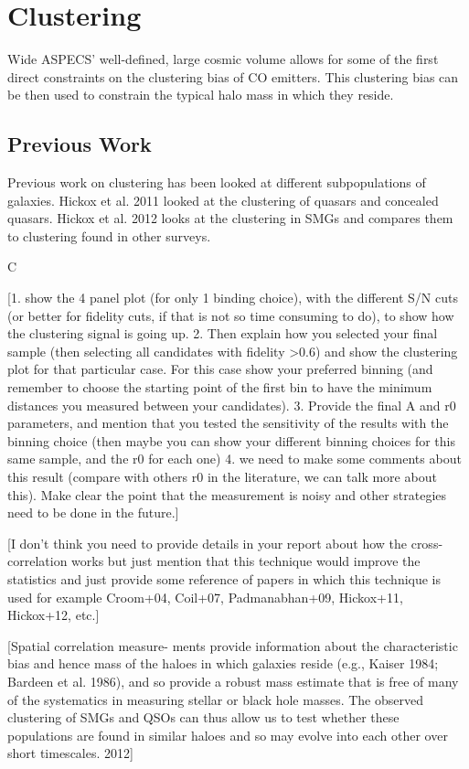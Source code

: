 \chapter{Clustering}

Wide ASPECS' well-defined, large cosmic volume allows for some of the first direct constraints on the clustering bias of CO emitters. This clustering bias can be then used to constrain the typical halo mass in which they reside. 

\section{Previous Work}

Previous work on clustering has been looked at different subpopulations of galaxies. Hickox et al. 2011 looked at the clustering of quasars and concealed quasars. Hickox et al. 2012 looks at the clustering in SMGs and compares them to clustering found in other surveys. 


C

[1. show the 4 panel plot (for only 1 binding choice), with the different S/N cuts (or better for fidelity cuts, if that is not so time consuming to do), to show how the clustering signal is going up. 
2. Then explain how you selected your final sample (then selecting all candidates with fidelity >0.6) and show the clustering plot for that particular case. For this case show your preferred binning (and remember to choose the starting point of the first bin to have the minimum distances you measured between your candidates). 
3. Provide the final A and r0 parameters, and mention that you tested the sensitivity of the results with the binning choice (then maybe you can show your different binning choices for this same sample, and the r0 for each one)
4. we need to make some comments about this result (compare with others r0 in the literature, we can talk more about this). Make clear the point that the measurement is noisy and other strategies need to be done in the future.]

[I don’t think you need to provide details in your report about how the cross-correlation works but just mention that this technique would improve the statistics and just provide some reference of papers in which this technique is used for example Croom+04, Coil+07, Padmanabhan+09, Hickox+11, Hickox+12, etc.]

[Spatial correlation measure-
ments provide information about the characteristic bias and hence
mass of the haloes in which galaxies reside (e.g., Kaiser 1984;
Bardeen et al. 1986), and so provide a robust mass estimate that is
free of many of the systematics in measuring stellar or black hole
masses. The observed clustering of SMGs and QSOs can thus allow
us to test whether these populations are found in similar haloes and
so may evolve into each other over short timescales. \cite{hickox2011clustering} 2012]


